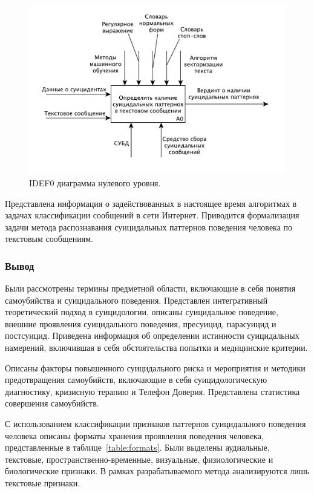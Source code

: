 \begin{figure}[H]
	\centering
	\includegraphics[width=\textwidth]{inc/A0.pdf}
	\caption{ IDEF0 диаграмма нулевого уровня. }
	\label{img:idef0}
\end{figure}


Представлена информация о задействованных в настоящее время алгоритмах в задачах классификации сообщений в сети Интернет.
Приводится формализация задачи метода распознавания суицидальных паттернов поведения человека по текстовым сообщениям.
\subsubsection*{Вывод}

Были рассмотрены термины предметной области, включающие в себя понятия самоубийства и суицидального поведения. 
Представлен интегративный теоретический подход в суицидологии, описаны суицидальное поведение, внешние проявления суицидального поведения, пресуицид, парасуицид и постсуицид. 
Приведена информация об определении истинности суицидальных намерений, включившая в себя обстоятельства попытки и медицинские критерии. 

Описаны факторы повышенного суицидального риска и мероприятия и методики предотвращения самоубийств, включающие в себя суицидологическую диагностику, кризисную терапию и Телефон Доверия.
Представлена статистика совершения самоубийств.

С использованием классификации признаков паттернов суицидального поведения человека описаны форматы хранения проявления поведения человека, представленные в таблице~\ref{table:formats}. 
Были выделены аудиальные, текстовые, пространственно-временные, визуальные, физиологические и биологические признаки.
В рамках разрабатываемого метода анализируются лишь текстовые признаки.


